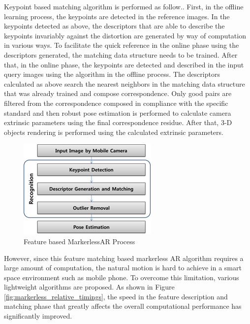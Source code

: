 Keypoint based matching algorithm is performed as follow.. First, in the offline learning process, the keypoints are detected in the reference images. In the keypoints detected as above, the descriptors that are able to describe the keypoints invariably against the distortion are generated by way of computation in various ways. To facilitate the quick reference in the online phase using the descriptors generated, the matching data structure needs to be trained. After that, in the online phase, the keypoints are detected and described in the input query images using the algorithm in the offline process. The descriptors calculated as above search the nearest neighbors in the matching data structure that was already trained and compose correspondence. Only good pairs are filtered from the correspondence composed in compliance with the specific standard and then robust pose estimation is performed to calculate camera extrinsic parameters using the final correspondence residue. After that, 3-D objects rendering is performed using the calculated extrinsic parameters. 
\begin{figure}[ht!]
\centering
\includegraphics[width=0.8\columnwidth]{2_relworks/process}
\caption{Feature based MarkerlessAR Process}
\label{fig:markerless_feature_process}
\end{figure}


However, since this feature matching based markerless AR algorithm requires a large amount of computation, the natural motion is hard to achieve in a smart space environment such as mobile phone. To overcome this limitation, various lightweight algorithms are proposed. As shown in Figure \ref{fig:markerless_relative_timings}, the speed in the feature description and matching phase that greatly affects the overall computational performance has significantly improved. 

